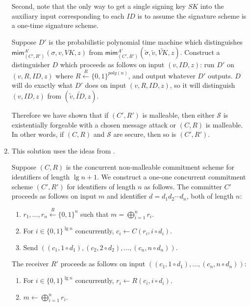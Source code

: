 \documentclass[draft]{article}
\newcommand{\getr}{\overset{R}{\gets}}
\newcommand{\getrn}{\getr\{0, 1\}^n}
\newcommand{\getrsingle}{\getr\{0, 1\}}
\newcommand{\getrpoly}{\getrsingle^{poly(n)}}
\newcommand{\mim}{\mathsf{mim}}
\begin{document}
\begin{enumerate}
  Second, note that the only way to get a single signing key $SK$ into the auxiliary input corresponding to each $ID$ is to assume the signature scheme is a one-time signature scheme.

  Suppose $D'$ is the probabilistic polynomial time machine which distinguishes $\mim^{A'}_{(C', R')}(\sigma, v, VK, z)$ from $\mim^{A'}_{(C', R')}(\tilde{\sigma}, \tilde{v}, \tilde{VK}, z)$.
  Construct a distinguisher $D$ which proceeds as follows on input $(v, ID, z)$: run $D'$ on $(v, R, ID, z)$ where $R\getrpoly$, and output whatever $D'$ outputs.
  $D$ will do exactly what $D'$ does on input $(v, R, ID, z)$, so it will distinguish $(v, ID, z)$ from $(\tilde{v}, \tilde{ID}, z)$.

  Therefore we have shown that if $(C', R')$ is malleable, then either $\mathcal{S}$ is existentially forgeable with a chosen message attack or $(C, R)$ is malleable.
  In other words, if $(C, R)$ and $\mathcal{S}$ are secure, then so is $(C', R')$.

\item
  This solution uses the ideas from \cite[Claim~4]{lpv}.

  Suppose $(C, R)$ is the concurrent non-malleable commitment scheme for identifiers of length $\lg n + 1$.
  We construct a one-one concurrent commitment scheme $(C', R')$ for identifiers of length $n$ as follows.
  The committer $C'$ proceeds as follows on input $m$ and identifier $d=d_1d_2\cdots d_n$, both of length $n$:
  \begin{enumerate}
  \item $r_1,\ldots,r_n\getrn$ such that $m=\bigoplus_{i=1}^n r_i$.
  \item For $i\in\{0, 1\}^{\lg n}$ concurrently, $c_i \gets C(r_i, i\circ d_i)$.
  \item Send $((c_1, 1\circ d_1), (c_2, 2\circ d_2), \ldots, (c_n, n\circ d_n))$.
  \end{enumerate}
  The receiver $R'$ proceeds as follows on input $((c_1, 1\circ d_1), \ldots, (c_n, n\circ d_n))$:
  \begin{enumerate}
  \item For $i\in\{0, 1\}^{\lg n}$ concurrently, $r_i\gets R(c_i, i\circ d_i)$.
  \item $m\gets\bigoplus_{i=1}^n r_i$.
  \end{enumerate}


\end{enumerate}
\end{document}
